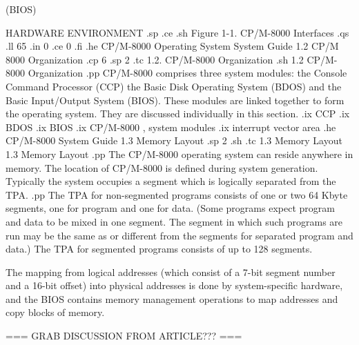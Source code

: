                          (BIOS)





                   HARDWARE ENVIRONMENT 
.sp
.ce
.sh
Figure 1-1.  CP/M-8000 Interfaces
.qs
.ll 65
.in 0
.ce 0
.fi
.he CP/M-8000 Operating System System Guide  1.2  CP/M 8000 Organization
.cp 6
.sp 2
.tc    1.2.  CP/M-8000 Organization 
.sh
1.2  CP/M-8000 Organization
.pp
CP/M-8000 comprises three system modules:  the Console Command Processor (CCP)
the Basic Disk Operating System (BDOS) and the Basic Input/Output System
(BIOS).  These modules are linked together to form the operating system.
They are discussed individually in this section.
.ix CCP
.ix BDOS
.ix BIOS
.ix CP/M-8000 , system modules
.ix interrupt vector area
.he CP/M-8000 System Guide                           1.3  Memory Layout
.sp 2
.sh
.tc    1.3  Memory Layout 
1.3  Memory Layout
.pp
The CP/M-8000 operating system can reside anywhere in memory.
The location of CP/M-8000 is defined 
during system generation.  Typically the system occupies a
segment which is logically separated from the TPA.
.pp
The TPA for non-segmented programs consists of one or two 64 Kbyte
segments, one for program and one for data.  (Some programs 
expect program and data to be mixed in one segment.  The segment
in which such programs are run may be the same as or different
from the segments for separated program and data.)  The TPA for
segmented programs consists of up to 128 segments.

The mapping from logical addresses (which consist of a 7-bit segment
number and a 16-bit offset) into physical addresses is done by
system-specific hardware, and the BIOS contains memory management
operations to map addresses and copy blocks of memory.

		=== GRAB DISCUSSION FROM ARTICLE??? ===

